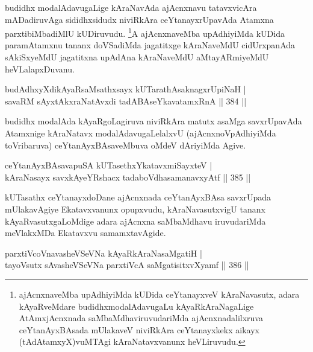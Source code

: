 \begin{artha}
budidhx modalAdavugaLige kAraNavAda ajAcnxnavu tatavxvicAra mADadiruvAga sididhxsidudx niviRkAra ceYtanayxrUpavAda Atamxna parxtibiMbadiMlU kUDiruvudu. \footnote{ajAcnxnaveMba upAdhiyiMda kUDida ceYtanayxveV kAraNavasutx, adara kAyaRveMdare budidhxmodalAdavugaLu kAyaRkAraNagaLige AtAmxjAcnxnada saMbaMdhaviruvudariMda ajAcnxnadalilxruva ceYtanAyxBAsada mUlakaveV niviRkAra ceYtanayxkekx aikayx (tAdAtamxyX)vuMTAgi kAraNatavxvanunx heVLiruvudu.}A ajAcnxnaveMba upAdhiyiMda kUDida paramAtamxnu tananx doVSadiMda jagatitxge kAraNaveMdU cidUrxpanAda sAkiSxyeMdU jagatitxna upAdAna kAraNaveMdU aMtayARmiyeMdU heVLalapxDuvanu.
\end{artha}

\begin{shl}
budAdhxyXdikAyaRsaMsathxsayx kUTarathAsaknagxrUpiNaH | \\
savaRM sAyxtAkxraNatAvxdi tadABAseYkavatamxRnA \hfill||  384 ||  
\end{shl}

\begin{artha}
budidhx modalAda kAyaRgoLagiruva niviRkAra matutx asaMga savxrUpavAda Atamxnige kAraNatavx modalAdavugaLelalxvU (ajAcnxnoVpAdhiyiMda toVribaruva) ceYtanAyxBAsaveMbuva oMdeV dAriyiMda Agive.
\end{artha}


\begin{shl}
ceYtanAyxBAsavapuSA kUTasethxYkatavxmiSayxteV | \\
kAraNasayx savxkAyeYRshacx tadaboVdhasamanavxyAtf \hfill||  385 ||  
\end{shl}

\begin{artha}
kUTasathx ceYtanayxdoDane ajAcnxnada ceYtanAyxBAsa savxrUpada mUlakavAgiye Ekatavxvanunx opupxvudu, kAraNavasutxvigU tananx kAyaRvasutxgaLoMdige adara ajAcnxna saMbaMdhavu iruvudariMda meVlakxMDa Ekatavxvu samamxtavAgide.
\end{artha}

\begin{shl}
parxtiVcoV\s navasheVSeVNa kAyaRkAraNasaMgatiH | \\
tayoVsutx sAvasheVSeVNa parxtiVcA saMgatisitxvXyamf \hfill||  386 ||  
\end{shl}


